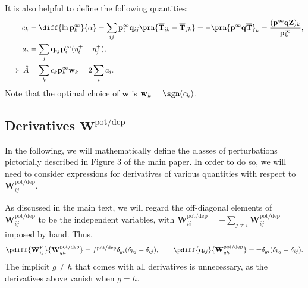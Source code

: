 \documentclass{article} %
\newcommand{\pr}{\mathbf{p}}
\newcommand{\eq}{\pr^\infty}
\newcommand{\fpt}{\mathbf{T}}
\newcommand{\fptb}{\overline{\fpt}}
\newcommand{\fund}{\mathbf{Z}}
\newcommand{\w}{\mathbf{w}}
\newcommand{\W}{\mathbf{W}}
\newcommand{\enc}{\mathbf{q}}
\newcommand{\frg}{\W^{\mathrm{F}}}
\newcommand{\potdep}{^{\text{pot/dep}}}
\begin{document}
It is also helpful to define the following quantities:
%
\begin{equation}\label{eq:areacoeffs}
  \begin{aligned}
    c_k &= \diff{\ln\eq_k}{\alpha}
      = \sum_{ij} \eq_i \enc_{ij} \prn{\fptb_{ik}-\fptb_{jk}}
      = - \prn{\eq \enc \fptb}_k
      = \frac{(\eq \enc \fund)_k}{\eq_k}, \\
    a_i &= \sum_j \enc_{ij} \eq_i (\eta^+_{i} - \eta^+_{j}),\\
    \implies
    \hat{A} &= \sum_k c_k \eq_k \w_k
      = 2\sum_i a_i.
  \end{aligned}
\end{equation}
%
Note that the optimal choice of $\w$ is $\w_k = \sgn(c_k)$.

\subsection{Derivatives \wrt \texorpdfstring{$\W\potdep $}{W(pot/dep)}}\label{sec:deriv}

In the following, we will mathematically define the classes of perturbations pictorially described in Figure 3 of the main paper.
In order to do so, we will need to consider expressions for derivatives of various quantities with respect to $\W\potdep_{ij}$.

As discussed in the main text,
we will regard the off-diagonal elements of $\W\potdep _{ij}$ to be the independent variables,
with $\W\potdep _{ii}=-\sum_{j \neq i} \W\potdep _{ij}$ imposed by hand.
Thus,
%
\begin{equation}\label{eq:basicderivs}
  \pdiff{\frg_{ij}}{\W\potdep _{gh}} = f\potdep  \delta_{gi}(\delta_{hj}-\delta_{ij}),
  \qquad
  \pdiff{\enc_{ij}}{\W\potdep _{gh}} = \pm\delta_{gi}(\delta_{hj}-\delta_{ij}).
\end{equation}
%
The implicit $g \neq h$ that comes with all derivatives is unnecessary, as the derivatives above vanish when $g=h$.
\end{document}
